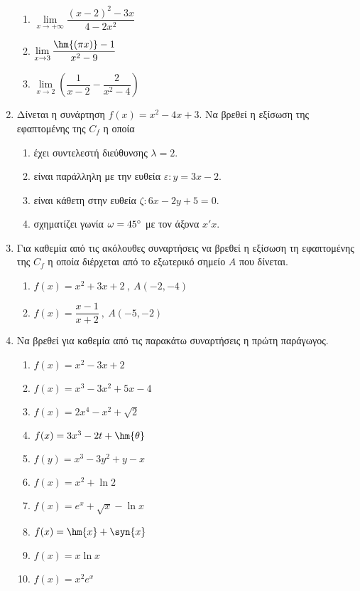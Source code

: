 \documentclass[10pt,a4paper]{article}
\begin{document}
\begin{enumerate}
\begin{multicols}{3}
\begin{enumerate}[itemsep=0mm,label=\roman*.]
\item $ \lim\limits_{x\to +\infty}{\dfrac{(x-2)^2-3x}{4-2x^2}} $
\item $ \lim\limits_{x\to 3}\dfrac{\hm{(\pi x)}-1}{x^2-9} $
\item $ \lim\limits_{x\to 2}\left(\dfrac{1}{x-2}-\dfrac{2}{x^2-4}\right) $
\end{enumerate}
\end{multicols}
\item Δίνεται η συνάρτηση $ f(x)=x^2-4x+3 $. Να βρεθεί η εξίσωση της εφαπτομένης της $ C_f $ η οποία
\begin{enumerate}[itemsep=0mm,label=\roman*.]
\item έχει συντελεστή διεύθυνσης $ \lambda=2 $.
\item είναι παράλληλη με την ευθεία $ \varepsilon:y=3x-2 $.
\item είναι κάθετη στην ευθεία $\zeta: 6x-2y+5=0 $.
\item σχηματίζει γωνία $ \omega=45\degree $ με τον άξονα $ x'x $.
\end{enumerate}
\item Για καθεμία από τις ακόλουθες συναρτήσεις να βρεθεί η εξίσωση τη εφαπτομένης της $ C_f $ η οποία διέρχεται από το εξωτερικό σημείο $ A $ που δίνεται.
\begin{multicols}{2}
\begin{enumerate}[itemsep=0mm,label=\roman*.]
\item $ f(x)=x^2+3x+2\ ,\ A(-2,-4) $
\item $ f(x)=\dfrac{x-1}{x+2}\ ,\ A(-5,-2) $
\end{enumerate}
\end{multicols}
\item Να βρεθεί για καθεμία από τις παρακάτω συναρτήσεις η πρώτη παράγωγος.
\begin{multicols}{3}
\begin{enumerate}[label=\roman*.]
\item $ f(x)=x^2-3x+2 $
\item $ f(x)=x^3-3x^2+5x-4 $
\item $ f(x)=2x^4-x^2+\sqrt{2} $
\item $ f(x)=3x^3-2t+\hm{\theta} $
\item $ f(y)=x^3-3y^2+y-x $
\item $ f(x)=x^2+\ln{2} $
\item $ f(x)=e^x+\sqrt{x}-\ln{x} $
\item $ f(x)=\hm{x}+\syn{x} $
\item $ f(x)=x\ln{x} $
\item $ f(x)=x^2e^x $

\end{enumerate}
\end{multicols}
\end{enumerate}
\end{document}
